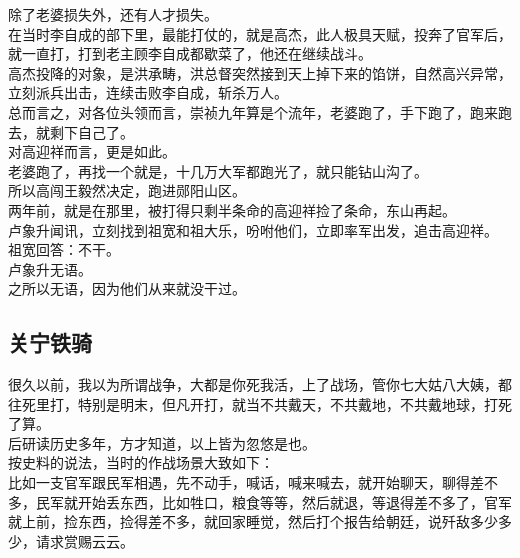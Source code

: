 \begin{multicols}{\theparacolNo}
除了老婆损失外，还有人才损失。\\

在当时李自成的部下里，最能打仗的，就是高杰，此人极具天赋，投奔了官军后，就一直打，打到老主顾李自成都歇菜了，他还在继续战斗。\\

高杰投降的对象，是洪承畴，洪总督突然接到天上掉下来的馅饼，自然高兴异常，立刻派兵出击，连续击败李自成，斩杀万人。\\

总而言之，对各位头领而言，崇祯九年算是个流年，老婆跑了，手下跑了，跑来跑去，就剩下自己了。\\

对高迎祥而言，更是如此。\\

老婆跑了，再找一个就是，十几万大军都跑光了，就只能钻山沟了。\\

所以高闯王毅然决定，跑进郧阳山区。\\

两年前，就是在那里，被打得只剩半条命的高迎祥捡了条命，东山再起。\\

卢象升闻讯，立刻找到祖宽和祖大乐，吩咐他们，立即率军出发，追击高迎祥。\\

祖宽回答：不干。\\

卢象升无语。\\

之所以无语，因为他们从来就没干过。\\

\subsection{关宁铁骑}
很久以前，我以为所谓战争，大都是你死我活，上了战场，管你七大姑八大姨，都往死里打，特别是明末，但凡开打，就当不共戴天，不共戴地，不共戴地球，打死了算。\\

后研读历史多年，方才知道，以上皆为忽悠是也。\\

按史料的说法，当时的作战场景大致如下：\\

比如一支官军跟民军相遇，先不动手，喊话，喊来喊去，就开始聊天，聊得差不多，民军就开始丢东西，比如牲口，粮食等等，然后就退，等退得差不多了，官军就上前，捡东西，捡得差不多，就回家睡觉，然后打个报告给朝廷，说歼敌多少多少，请求赏赐云云。\\


\end{multicols}
